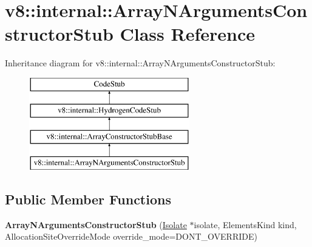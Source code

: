 \hypertarget{classv8_1_1internal_1_1_array_n_arguments_constructor_stub}{}\section{v8\+:\+:internal\+:\+:Array\+N\+Arguments\+Constructor\+Stub Class Reference}
\label{classv8_1_1internal_1_1_array_n_arguments_constructor_stub}
Inheritance diagram for v8\+:\+:internal\+:\+:Array\+N\+Arguments\+Constructor\+Stub\+:\begin{figure}[H]
\begin{center}
\leavevmode
\includegraphics[height=4.000000cm]{classv8_1_1internal_1_1_array_n_arguments_constructor_stub}
\end{center}
\end{figure}
\subsection*{Public Member Functions}
\begin{DoxyCompactItemize}
\item 
{\bfseries Array\+N\+Arguments\+Constructor\+Stub} (\hyperlink{classv8_1_1internal_1_1_isolate}{Isolate} $\ast$isolate, Elements\+Kind kind, Allocation\+Site\+Override\+Mode override\+\_\+mode=D\+O\+N\+T\+\_\+\+O\+V\+E\+R\+R\+I\+DE)\hypertarget{classv8_1_1internal_1_1_array_n_arguments_constructor_stub_a9ec2931b8761a2b39a5c9b569d404a47}{}\label{classv8_1_1internal_1_1_array_n_arguments_constructor_stub_a9ec2931b8761a2b39a5c9b569d404a47}

\end{DoxyCompactItemize}
